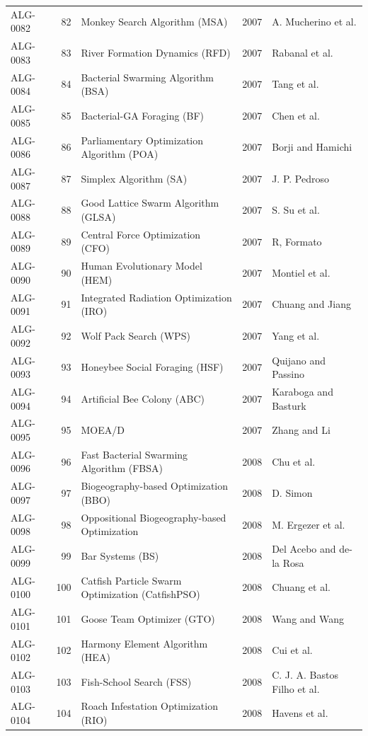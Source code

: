 \documentclass[8pt]{article}
\begin{document}
\begin{landscape}
\begin{longtable}{P{1.7cm}rP{10.0cm}rP{7.2cm}}
ALG-0082 & 82 & Monkey Search Algorithm (MSA) & 2007 & A. Mucherino et al. \\
ALG-0083 & 83 & River Formation Dynamics (RFD) & 2007 & Rabanal et al. \\
ALG-0084 & 84 & Bacterial Swarming Algorithm (BSA) & 2007 & Tang et al. \\
ALG-0085 & 85 & Bacterial-GA Foraging (BF) & 2007 & Chen et al. \\
ALG-0086 & 86 & Parliamentary Optimization Algorithm (POA) & 2007 & Borji and Hamichi \\
ALG-0087 & 87 & Simplex Algorithm (SA) & 2007 & J. P. Pedroso \\
ALG-0088 & 88 & Good Lattice Swarm Algorithm (GLSA) & 2007 & S. Su et al. \\
ALG-0089 & 89 & Central Force Optimization (CFO) & 2007 & R, Formato \\
ALG-0090 & 90 & Human Evolutionary Model (HEM) & 2007 & Montiel et al. \\
ALG-0091 & 91 & Integrated Radiation Optimization (IRO) & 2007 & Chuang and Jiang \\
ALG-0092 & 92 & Wolf Pack Search (WPS) & 2007 & Yang et al. \\
ALG-0093 & 93 & Honeybee Social Foraging (HSF) & 2007 & Quijano and Passino \\
ALG-0094 & 94 & Artificial Bee Colony (ABC) & 2007 & Karaboga and Basturk \\
ALG-0095 & 95 & MOEA/D & 2007 & Zhang and Li \\
ALG-0096 & 96 & Fast Bacterial Swarming Algorithm (FBSA) & 2008 & Chu et al. \\
ALG-0097 & 97 & Biogeography-based Optimization (BBO) & 2008 & D. Simon \\
ALG-0098 & 98 & Oppositional Biogeography-based Optimization & 2008 & M. Ergezer et al. \\
ALG-0099 & 99 & Bar Systems (BS) & 2008 & Del Acebo and de-la Rosa \\
ALG-0100 & 100 & Catfish Particle Swarm Optimization (CatfishPSO) & 2008 & Chuang et al. \\
ALG-0101 & 101 & Goose Team Optimizer (GTO) & 2008 & Wang and Wang \\
ALG-0102 & 102 & Harmony Element Algorithm (HEA) & 2008 & Cui et al. \\
ALG-0103 & 103 & Fish-School Search (FSS) & 2008 & C. J. A. Bastos Filho et al. \\
ALG-0104 & 104 & Roach Infestation Optimization (RIO) & 2008 & Havens et al. \\

\end{longtable}
\end{landscape}
\end{document}
